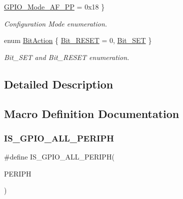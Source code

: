\begin{DoxyCompactItemize}
\mbox{\hyperlink{group___g_p_i_o___exported___types_gga1347339e1c84a196fabbb31205eec5d4a5c7a69abc1bf31a8d24e896ed94bded9}{G\+P\+I\+O\+\_\+\+Mode\+\_\+\+A\+F\+\_\+\+PP}} = 0x18
 \}
\begin{DoxyCompactList}\small\item\em Configuration Mode enumeration. \end{DoxyCompactList}\item 
enum \mbox{\hyperlink{group___g_p_i_o___exported___types_ga176130b21c0e719121470a6042d4cf19}{Bit\+Action}} \{ \mbox{\hyperlink{group___g_p_i_o___exported___types_gga176130b21c0e719121470a6042d4cf19ae2c026f2b44a949f82a65f3385edef09}{Bit\+\_\+\+R\+E\+S\+ET}} = 0, 
\mbox{\hyperlink{group___g_p_i_o___exported___types_gga176130b21c0e719121470a6042d4cf19a3c477841a6ceec13fe47ef322432b992}{Bit\+\_\+\+S\+ET}}
 \}
\begin{DoxyCompactList}\small\item\em Bit\+\_\+\+S\+ET and Bit\+\_\+\+R\+E\+S\+ET enumeration. \end{DoxyCompactList}\end{DoxyCompactItemize}


\subsection{Detailed Description}


\subsection{Macro Definition Documentation}
\mbox{\label{group___g_p_i_o___exported___types_ga68b2a1f0b05c13978217db5439c7f790}} 
\subsubsection{\texorpdfstring{IS\_GPIO\_ALL\_PERIPH}{IS\_GPIO\_ALL\_PERIPH}}
{\footnotesize\ttfamily \#define I\+S\+\_\+\+G\+P\+I\+O\+\_\+\+A\+L\+L\+\_\+\+P\+E\+R\+I\+PH(\begin{DoxyParamCaption}\item[{}]{P\+E\+R\+I\+PH }\end{DoxyParamCaption})}

